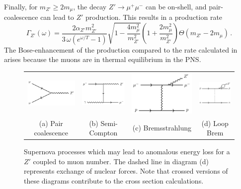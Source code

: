\documentclass[11pt]{article}
\newcommand{\pL}{\left(} \newcommand{\pR}{\right)} \newcommand{\bL}{\left[} \newcommand{\bR}{\right]} \newcommand{\cbL}{\left\{} \newcommand{\cbR}{\right\}} \newcommand{\mL}{\left|} \newcommand{\mR}{\right|}
\newcommand{\beq}{\begin{equation}} \newcommand{\eeq}{\end{equation}}
\begin{document}
Finally, for $m_{Z'} \geq 2m_\mu$, the decay $Z' \to \mu^+ \mu^-$ can be on-shell, and pair-coalescence can lead to $Z'$ production. This results in a production rate
\beq
\Gamma_{Z'}(\omega) = \frac{2\alpha_{Z'} m_{Z'}^2}{3 \, \omega ( e^{\omega/T}-1 ) } \sqrt{1- \frac{4m_\mu^2}{m_{Z'}^2}} \pL1 +\frac{2m_\mu^2}{m_{Z'}^2} \pR \Theta(m_{Z'} - 2m_\mu) \,.
\eeq
The Bose-enhancement of the production compared to the rate calculated in~\cite{Escudero:2019gzq} arises because the muons are in thermal equilibrium in the PNS.

\begin{figure}
\begin{tabular}{cccc}
  \includegraphics[width=0.23\columnwidth]{coal} &  
    \includegraphics[width=0.23\columnwidth]{semicompton} &
    \includegraphics[width=0.23\columnwidth]{mubrem} &
    \includegraphics[width=0.23\columnwidth]{loopbrem} \\
(a) Pair coalescence  & (b) Semi-Compton & (c) Bremsstrahlung & (d) Loop Brem \\[6pt]
\end{tabular}
\caption{Supernova processes which may lead to anomalous energy loss for a $Z'$ coupled to muon number.  The dashed line in diagram (d) represents exchange of nuclear forces. Note that crossed versions of these diagrams contribute to the cross section calculations.}
\label{fig:production}
\end{figure}
\end{document}
